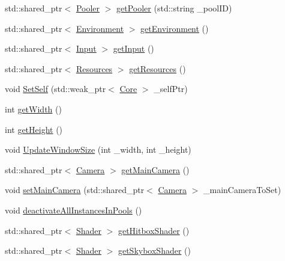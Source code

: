 \begin{DoxyCompactItemize}
\item 
std\+::shared\+\_\+ptr$<$ \hyperlink{classfrontier_1_1_pooler}{Pooler} $>$ \hyperlink{classfrontier_1_1_core_a25d135e58034991db392afbb585c46e3}{get\+Pooler} (std\+::string \+\_\+pool\+ID)
\item 
std\+::shared\+\_\+ptr$<$ \hyperlink{classfrontier_1_1_environment}{Environment} $>$ \hyperlink{classfrontier_1_1_core_ad9e6e54c9ea2e9e29c15ea6b50fef89c}{get\+Environment} ()
\item 
std\+::shared\+\_\+ptr$<$ \hyperlink{classfrontier_1_1_input}{Input} $>$ \hyperlink{classfrontier_1_1_core_ae1c1a6ee15d7a2062e23d993da2dc74f}{get\+Input} ()
\item 
std\+::shared\+\_\+ptr$<$ \hyperlink{classfrontier_1_1_resources}{Resources} $>$ \hyperlink{classfrontier_1_1_core_ac001bac9de75ba256fd3ce3251c6d624}{get\+Resources} ()
\item 
void \hyperlink{classfrontier_1_1_core_a92669a2d7754db9bcf3ff600f54952ae}{Set\+Self} (std\+::weak\+\_\+ptr$<$ \hyperlink{classfrontier_1_1_core}{Core} $>$ \+\_\+self\+Ptr)
\item 
int \hyperlink{classfrontier_1_1_core_a33e04425e25f249efb46e116eedca8dc}{get\+Width} ()
\item 
int \hyperlink{classfrontier_1_1_core_a030aa01041c12b979420523b6be96d12}{get\+Height} ()
\item 
void \hyperlink{classfrontier_1_1_core_afc0055ffb384320d59e94003a5873b8c}{Update\+Window\+Size} (int \+\_\+width, int \+\_\+height)
\item 
std\+::shared\+\_\+ptr$<$ \hyperlink{classfrontier_1_1_camera}{Camera} $>$ \hyperlink{classfrontier_1_1_core_aaac15b0d42e84ab56a18058721b275de}{get\+Main\+Camera} ()
\item 
void \hyperlink{classfrontier_1_1_core_ae141ff5c7d41cf7bc22c37bddb9087f9}{set\+Main\+Camera} (std\+::shared\+\_\+ptr$<$ \hyperlink{classfrontier_1_1_camera}{Camera} $>$ \+\_\+main\+Camera\+To\+Set)
\item 
void \hyperlink{classfrontier_1_1_core_ac5a33059b33eec0ab216b45aa9772297}{deactivate\+All\+Instances\+In\+Pools} ()
\item 
std\+::shared\+\_\+ptr$<$ \hyperlink{classfrontier_1_1_shader}{Shader} $>$ \hyperlink{classfrontier_1_1_core_a5c92add403b305f061f691d9c21d63c0}{get\+Hitbox\+Shader} ()
\item 
std\+::shared\+\_\+ptr$<$ \hyperlink{classfrontier_1_1_shader}{Shader} $>$ \hyperlink{classfrontier_1_1_core_a0da8b576b0d812148924827da5c05a3d}{get\+Skybox\+Shader} ()
\item 

\end{DoxyCompactItemize}
